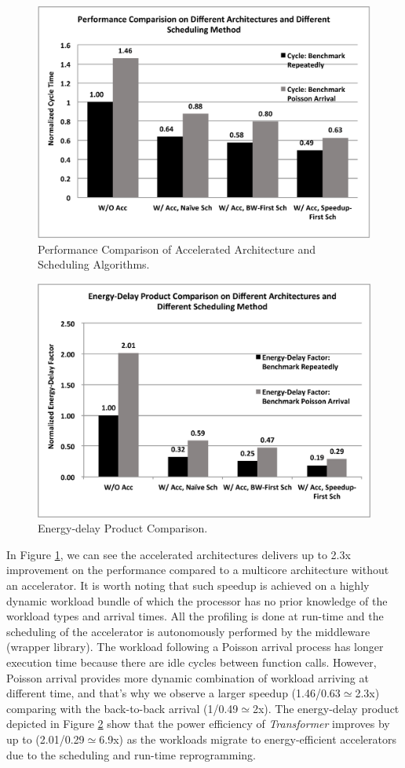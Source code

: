 \begin{figure}
    \centering
    \includegraphics[width=4.5in]{Cycle-8core}
    \caption{Performance Comparison of Accelerated Architecture and Scheduling Algorithms.}
    \label{fig_8core_cycle}
\end{figure}

\begin{figure}
    \centering
    \includegraphics[width=4.5in]{Energy-Delay-8core}
    \caption{Energy-delay Product Comparison.}
    \label{fig_8core_energy_delay}
\end{figure}

In Figure \ref{fig_8core_cycle}, we can see the accelerated
architectures delivers up to 2.3x improvement on the performance
compared to a multicore architecture without an accelerator. It is
worth noting that such speedup is achieved on a highly dynamic
workload bundle of which the processor has no prior knowledge of the
workload types and arrival times. All the profiling is done at run-time and the
scheduling of the accelerator is autonomously performed by the
middleware (wrapper library). The workload following a Poisson arrival
process has longer execution time because there are idle cycles
between function calls. However, Poisson arrival provides more dynamic
combination of workload arriving at different time, and that's why we
observe a larger speedup (1.46/0.63$\simeq$2.3x) comparing with the
back-to-back arrival (1/0.49$\simeq$2x). 
The energy-delay product depicted in Figure
\ref{fig_8core_energy_delay} show that the power efficiency of {\em
 Transformer} improves by up to (2.01/0.29$\simeq$6.9x) as the workloads migrate to
energy-efficient accelerators due to the scheduling and run-time
reprogramming.


